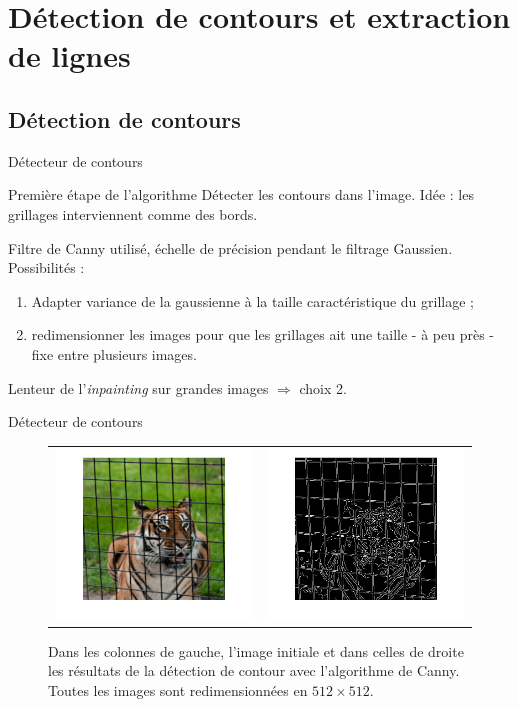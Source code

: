\section{Détection de contours et extraction de lignes}

\subsection{Détection de contours}

\begin{frame}{Détecteur de contours}
\begin{block}{Première étape de l'algorithme}
Détecter les contours dans l'image. Idée : les grillages interviennent comme des bords.
\end{block}
Filtre de Canny utilisé, échelle de précision pendant le filtrage Gaussien. Possibilités :
\begin{enumerate}
\item Adapter variance de la gaussienne à la taille caractéristique du grillage ;
\item redimensionner les images pour que les grillages ait une taille - à peu près - fixe entre plusieurs images. 
\end{enumerate}
Lenteur de l'\emph{inpainting} sur grandes images $\Rightarrow$ choix 2.
\end{frame}

\begin{frame}{Détecteur de contours}
\begin{figure}[ht!]
\centering
\begin{tabular}{cc}
\includegraphics[width = .5\columnwidth]{fig/tigre_rescale.png} &
\includegraphics[width = .5\columnwidth]{fig/contour.png} 
\end{tabular}
\caption{Dans les colonnes de gauche, l'image initiale et dans celles de droite les résultats de la détection de contour avec l'algorithme de Canny. Toutes les images sont redimensionnées en $512\times 512$. }
\end{figure}
\end{frame}


